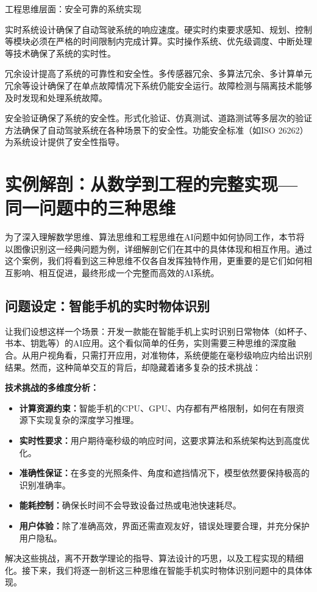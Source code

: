 工程思维层面：安全可靠的系统实现

实时系统设计确保了自动驾驶系统的响应速度。硬实时约束要求感知、规划、控制等模块必须在严格的时间限制内完成计算。实时操作系统、优先级调度、中断处理等技术确保了系统的实时性。

冗余设计提高了系统的可靠性和安全性。多传感器冗余、多算法冗余、多计算单元冗余等设计确保了在单点故障情况下系统仍能安全运行。故障检测与隔离技术能够及时发现和处理系统故障。

安全验证确保了系统的安全性。形式化验证、仿真测试、道路测试等多层次的验证方法确保了自动驾驶系统在各种场景下的安全性。功能安全标准（如ISO 26262）为系统设计提供了安全性指导。

\section{实例解剖：从数学到工程的完整实现---同一问题中的三种思维}
为了深入理解数学思维、算法思维和工程思维在AI问题中如何协同工作，本节将以图像识别这一经典问题为例，详细解剖它们在其中的具体体现和相互作用。通过这个案例，我们将看到这三种思维不仅各自发挥独特作用，更重要的是它们如何相互影响、相互促进，最终形成一个完整而高效的AI系统。

\subsection{问题设定：智能手机的实时物体识别}
让我们设想这样一个场景：开发一款能在智能手机上实时识别日常物体（如杯子、书本、钥匙等）的AI应用。这个看似简单的任务，实则需要三种思维的深度融合。从用户视角看，只需打开应用，对准物体，系统便能在毫秒级响应内给出识别结果。然而，这种简单交互的背后，却隐藏着诸多复杂的技术挑战：

\textbf{技术挑战的多维度分析：}
\begin{itemize}
\item \textbf{计算资源约束：}智能手机的CPU、GPU、内存都有严格限制，如何在有限资源下实现复杂的深度学习推理。
\item \textbf{实时性要求：}用户期待毫秒级的响应时间，这要求算法和系统架构达到高度优化。
\item \textbf{准确性保证：}在多变的光照条件、角度和遮挡情况下，模型依然要保持极高的识别准确率。
\item \textbf{能耗控制：}确保长时间不会导致设备过热或电池快速耗尽。
\item \textbf{用户体验：}除了准确高效，界面还需直观友好，错误处理要合理，并充分保护用户隐私。
\end{itemize}

解决这些挑战，离不开数学理论的指导、算法设计的巧思，以及工程实现的精细化。接下来，我们将逐一剖析这三种思维在智能手机实时物体识别问题中的具体体现。

